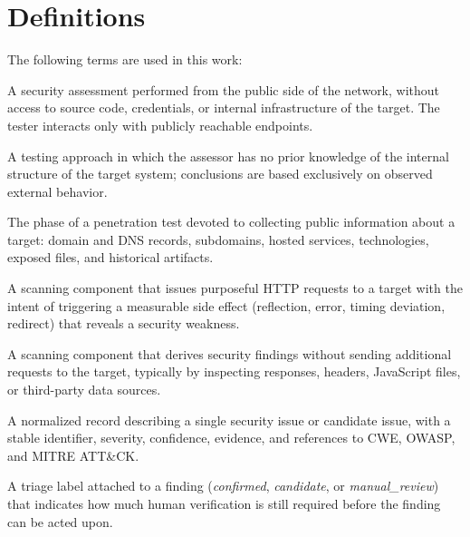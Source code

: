 \chapter{Definitions}

The following terms are used in this work:\par\bigskip

\begin{description}[style=multiline, labelwidth=4.2cm, leftmargin=4.6cm]

  \item[external penetration testing]
       A security assessment performed from the public side of the network, without access to source code, credentials, or internal infrastructure of the target. The tester interacts only with publicly reachable endpoints.

  \item[black-box testing]
       A testing approach in which the assessor has no prior knowledge of the internal structure of the target system; conclusions are based exclusively on observed external behavior.

  \item[reconnaissance]
       The phase of a penetration test devoted to collecting public information about a target: domain and DNS records, subdomains, hosted services, technologies, exposed files, and historical artifacts.

  \item[active probe]
       A scanning component that issues purposeful HTTP requests to a target with the intent of triggering a measurable side effect (reflection, error, timing deviation, redirect) that reveals a security weakness.

  \item[passive analysis]
       A scanning component that derives security findings without sending additional requests to the target, typically by inspecting responses, headers, JavaScript files, or third-party data sources.

  \item[finding]
       A normalized record describing a single security issue or candidate issue, with a stable identifier, severity, confidence, evidence, and references to CWE, OWASP, and MITRE ATT\&CK.

  \item[verdict]
       A triage label attached to a finding (\textit{confirmed}, \textit{candidate}, or \textit{manual\_review}) that indicates how much human verification is still required before the finding can be acted upon.


\end{description}
